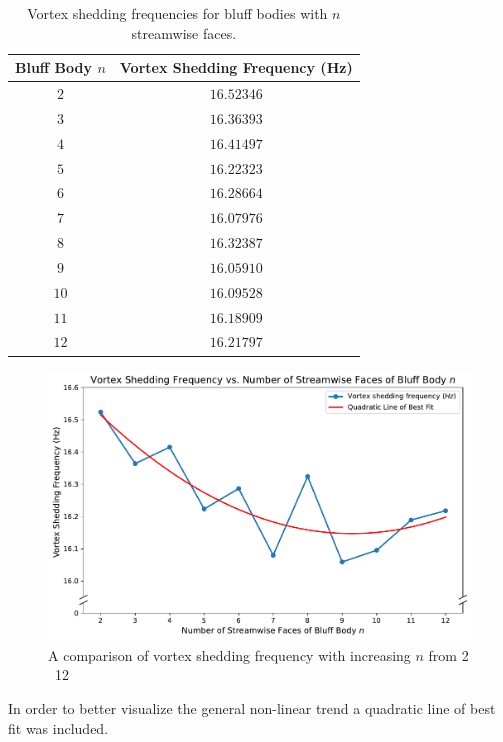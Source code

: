 \begin{table}[H]
	\centering
	\renewcommand{\arraystretch}{1.3}
	\begin{tabular}{|c|c|}
		\hline
		\textbf{Bluff Body $n$} & \textbf{Vortex Shedding Frequency (\si{\hertz})} \\
		\hline
		$2$  & $16.52346$ \\
		\hline
		$3$  & $16.36393$ \\
		\hline
		$4$  & $16.41497$ \\
		\hline
		$5$  & $16.22323$ \\
		\hline
		$6$  & $16.28664$ \\
		\hline
		$7$  & $16.07976$ \\
		\hline
		$8$  & $16.32387$ \\
		\hline
		$9$  & $16.05910$ \\
		\hline
		$10$ & $16.09528$ \\
		\hline
		$11$ & $16.18909$ \\
		\hline
		$12$ & $16.21797$ \\
		\hline
	\end{tabular}
	\caption{Vortex shedding frequencies for bluff bodies with $n$ streamwise faces.}
	\label{tab:frequencyData}
\end{table}


\begin{figure}[H]
	\centering
	\includegraphics[width=\textwidth]{images/overall}
	\caption{A comparison of vortex shedding frequency with increasing $n$ from 2 \textendash\ 12}
	\label{fig:overall} 
\end{figure}

In order to better visualize the general non-linear trend a quadratic line of best fit was included. 


